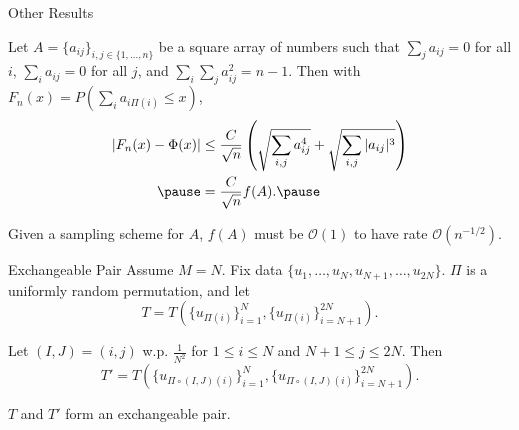 \documentclass{beamer}
\newcommand{\var}{\mathrm{var}}
\newcommand{\E}{\mathbb{E}}
\begin{document}
\begin{frame}{Other Results}
  \begin{theorem}
    Let $A = \{a_{ij}\}_{i, j \in \{1, \ldots, n\}}$ be a square array of
      numbers such that $\sum_j a_{ij} = 0$ for all $i$, $\sum_i
      a_{ij} = 0$ for all $j$, and $\sum_i \sum_j a_{ij}^2 = n - 1$.
      Then with $F_n(x) = P(\sum_i a_{i\Pi(i)} \leq x)$,
  \begin{align*}
    |F_n(x) - \Phi(x)| &\leq \frac{C}{\sqrt{n}}
    \left (
      \sqrt{\sum_{i,j}a_{ij}^4} + \sqrt{\sum_{i,j}|a_{ij}|^3}
    \right ) \\ \pause
    &= \frac{C}{\sqrt{n}} f(A). \pause
  \end{align*}
  \end{theorem}
  Given a sampling scheme for $A$, $f(A)$ must be $\mathcal{O}(1)$ to have rate $\mathcal{O}(n^{-1/2})$.
\end{frame}

\begin{frame}{Exchangeable Pair}
  Assume $M = N$.  Fix data $\{u_1, \ldots, u_N,
  u_{N+1}, \ldots, u_{2N}\}$.  $\Pi$ is a uniformly random permutation, and let
  \begin{equation*}
    T = T \left (\{u_{\Pi(i)}\}_{i=1}^{N},
      \{u_{\Pi(i)}\}_{i=N+1}^{2N} \right).
  \end{equation*}
  \pause

  Let $(I, J) = (i, j)$ w.p. $\frac{1}{N^2}$ for $1 \leq i \leq N$ and
  $N + 1 \leq j \leq 2N$.  Then
  \begin{equation*}
    T' = T \left (\{u_{\Pi \circ (I, J) (i)}\}_{i=1}^{N},
      \{u_{\Pi \circ (I, J) (i)}\}_{i=N+1}^{2N} \right).
  \end{equation*}
  \pause

  $T$ and $T'$ form an exchangeable pair.
\end{frame}

\end{document}
